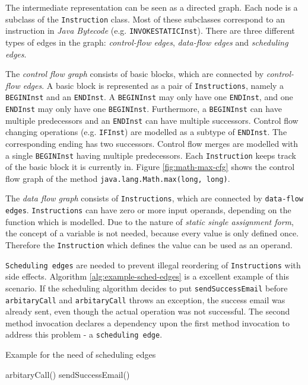 \documentclass[draft, final]{vutinfth} %
\begin{document}
The intermediate representation can be seen as a directed graph. Each node is a subclass of the \texttt{Instruction} class. Most of these subclasses correspond to an instruction in \emph{Java Bytecode} (e.g. \texttt{INVOKESTATICInst}). There are three different types of edges in the graph: \emph{control-flow edges}, \emph{data-flow edges} and \emph{scheduling edges}.

The \emph{control flow graph} consists of basic blocks, which are connected by \emph{control-flow edges}. A basic block is represented as a pair of \texttt{Instructions}, namely a \texttt{BEGINInst} and an \texttt{ENDInst}. A \texttt{BEGINInst} may only have one \texttt{ENDInst}, and one \texttt{ENDInst} may only have one \texttt{BEGINInst}. Furthermore, a \texttt{BEGINInst} can have multiple predecessors and an \texttt{ENDInst} can have multiple successors. Control flow changing operations (e.g. \texttt{IFInst}) are modelled as a subtype of \texttt{ENDInst}. The corresponding ending has two successors. Control flow merges are modelled with a single \texttt{BEGINInst} having multiple predecessors. Each \texttt{Instruction} keeps track of the basic block it is currently in. Figure \ref{fig:math-max-cfg} shows the control flow graph of the method \texttt{java.lang.Math.max(long, long)}.

The \emph{data flow graph} consists of \texttt{Instructions}, which are connected by \texttt{data-flow edges}. \texttt{Instructions} can have zero or more input operands, depending on the function which is modelled. Due to the nature of \emph{static single assignment form}, the concept of a variable is not needed, because every value is only defined once. Therefore the \texttt{Instruction} which defines the value can be used as an operand.

\texttt{Scheduling edges} are needed to prevent illegal reordering of \texttt{Instructions} with side effects. Algorithm \ref{alg:example-sched-edges} is a excellent example of this scenario. If the scheduling algorithm decides to put \texttt{sendSuccessEmail} before \texttt{arbitaryCall} and \texttt{arbitaryCall} throws an exception, the success email was already sent, even though the actual operation was not successful. The second method invocation declares a dependency upon the first method invocation to address this problem - a \texttt{scheduling edge}.

\begin{algorithm}[H]
\caption{Example for the need of scheduling edges}
\label{alg:example-sched-edges}
    arbitaryCall()\;
    sendSuccessEmail()\;
\end{algorithm}
\end{document}
